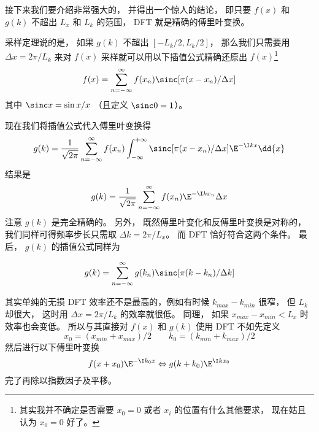 接下来我们要介绍非常强大的， 并得出一个惊人的结论， 即只要 $f(x)$ 和 $g(k)$ 不超出 $L_x$ 和 $L_k$ 的范围， DFT 就是精确的傅里叶变换。

采样定理说的是， 如果 $g(k)$ 不超出 $[-L_k/2, L_k/2]$， 那么我们只需要用 $\Delta x = 2\pi/L_k$ 来对  $f(x)$  采样就可以用以下插值公式精确还原出 $f(x)$\footnote{其实我并不确定是否需要 $x_0 = 0$ 或者 $x_i$ 的位置有什么其他要求， 现在姑且认为 $x_0 = 0$ 好了。}
\begin{equation}
f(x) = \sum_{n = -\infty}^{\infty} f(x_n)\sinc[\pi(x - x_n)/\Delta x]
\end{equation}
其中 $\sinc x = \sin x/x$ （且定义 $\sinc 0 = 1$）。

现在我们将插值公式代入傅里叶变换得
\begin{equation}
g(k) =  \frac{1}{\sqrt{2\pi}} \sum_{n = -\infty}^{\infty} f(x_n) \int_{-\infty}^{+\infty}\sinc[\pi(x - x_n)/\Delta x] \E^{-\I k x} \dd{x}
\end{equation}
结果是
\begin{equation}
g(k) = \frac{1}{\sqrt{2\pi}} \sum_{n = -\infty}^{\infty} f(x_n) \E^{-\I kx_n} \Delta x
\end{equation}
注意 $g(k)$ 是完全精确的。 另外， 既然傅里叶变化和反傅里叶变换是对称的， 我们同样可得频率步长只需取 $\Delta k = 2\pi/ L_x$。 而 DFT 恰好符合这两个条件。 最后， $g(k)$ 的插值公式同样为

\begin{equation}
g(k) = \sum_{n = -\infty}^{\infty} g(k_n)\sinc[\pi(k - k_n)/\Delta k]
\end{equation}

其实单纯的无损 DFT 效率还不是最高的，例如有时候 $k_{max}-k_{min}$ 很窄， 但 $L_k$ 却很大， 这时用 $\Delta x = 2\pi/L_k$ 的效率就很低。 同理， 如果 $x_{max} - x_{min} < L_x$ 时效率也会变低。 所以与其直接对 $f(x)$ 和 $g(k)$ 使用 DFT 不如先定义
\begin{equation}
x_0 = (x_{min} + x_{max})/2 \qquad k_0 = (k_{min} + k_{max})/2
\end{equation}
然后进行以下傅里叶变换
\begin{equation}
f(x+x_0)\E^{-\I k_0 x} \Leftrightarrow g(k+k_0)\E^{\I k x_0}
\end{equation}
完了再除以指数因子及平移。

